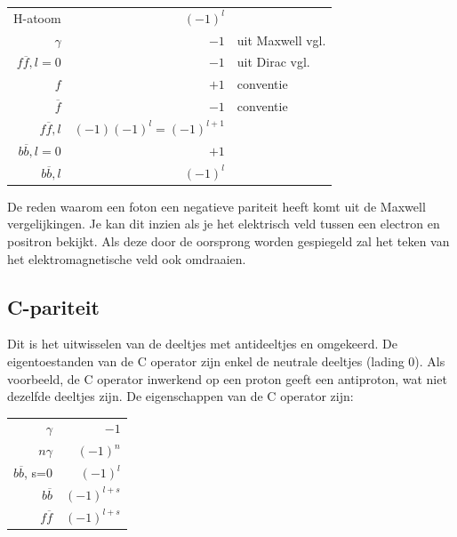 \documentclass[../main.tex]{subfiles}
\begin{document}
\begin{table}[h]
    \centering
    \label{tab:par_eig}
    \begin{tabular}{r|rl}
        H-atoom             & $(-1)^l$                  &                   \\
        $\gamma$            & $-1$                      & uit Maxwell vgl.  \\
        $f\overline f,l=0$  & $-1$                      & uit Dirac vgl.    \\
        $f$                 & $+1$                      & conventie         \\
        $\overline f$       & $-1$                      & conventie         \\
        $f\overline f,l$    & $(-1)(-1)^l=(-1)^{l+1}$   &                   \\
        $b\overline b,l=0$  & $+1$                      &                   \\
        $b\overline b,l$    & $(-1)^l$                  &                   \\
    \end{tabular}
\end{table}

De reden waarom een foton een negatieve pariteit heeft komt uit de Maxwell vergelijkingen. Je kan dit inzien als je het elektrisch veld tussen een electron en positron bekijkt. Als deze door de oorsprong worden gespiegeld zal het teken van het elektromagnetische veld ook omdraaien.

\subsection{C-pariteit}%
\label{sub:c_pariteit}

Dit is het uitwisselen van de deeltjes met antideeltjes en omgekeerd. De eigentoestanden van de C operator zijn enkel de neutrale deeltjes (lading 0). Als voorbeeld, de C operator inwerkend op een proton geeft een antiproton, wat niet dezelfde deeltjes zijn. De eigenschappen van de C operator zijn:

\begin{table}[h]
    \centering
    \label{tab:c_eig}
    \begin{tabular}{r|r}
        $\gamma$        & $-1$          \\
        $n\gamma$       & $(-1)^n$      \\
        $b \overline b$, s=0 & $(-1)^{l}$  \\
        $b \overline b$ & $(-1)^{l+s}$  \\
        $f \overline f$ & $(-1)^{l+s}$  \\
    \end{tabular}
\end{table}
\end{document}
